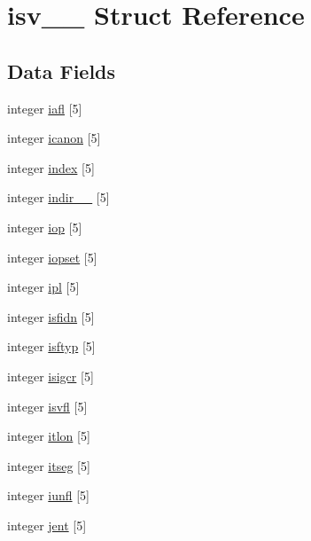 \hypertarget{structisv__1__}{}\section{isv\+\_\+\_\+ Struct Reference}
\label{structisv__1__}
\subsection*{Data Fields}
\begin{DoxyCompactItemize}
\item 
integer \hyperlink{structisv__1___a110053f41da17aeb74e0c20eb537925b}{iafl} \mbox{[}5\mbox{]}
\item 
integer \hyperlink{structisv__1___a60c852ae9ab4f41da8422a78bd2e3ddf}{icanon} \mbox{[}5\mbox{]}
\item 
integer \hyperlink{structisv__1___a204b23597107883203d7e9440f6a2842}{index} \mbox{[}5\mbox{]}
\item 
integer \hyperlink{structisv__1___a94fbd525d54bdfb30be1d9e07ee60ee7}{indir\+\_\+\+\_\+} \mbox{[}5\mbox{]}
\item 
integer \hyperlink{structisv__1___a6f46521e28e3eadcb479e385590fc1a6}{iop} \mbox{[}5\mbox{]}
\item 
integer \hyperlink{structisv__1___a9e20320344cbbf667a8c970a9ba05eab}{iopset} \mbox{[}5\mbox{]}
\item 
integer \hyperlink{structisv__1___a47696a386fd37002d15054e348f709d2}{ipl} \mbox{[}5\mbox{]}
\item 
integer \hyperlink{structisv__1___a20d9b0a1caec9e6e55c4392888cc85b2}{isfidn} \mbox{[}5\mbox{]}
\item 
integer \hyperlink{structisv__1___a95d67e7bab2248a8a3d7efb192a13e45}{isftyp} \mbox{[}5\mbox{]}
\item 
integer \hyperlink{structisv__1___af1060d057ba92173dab9ffa6385a9a4b}{isigcr} \mbox{[}5\mbox{]}
\item 
integer \hyperlink{structisv__1___a68ef3c478c099d73e4744b55c58bb0cc}{isvfl} \mbox{[}5\mbox{]}
\item 
integer \hyperlink{structisv__1___ad62c553111ab8723705b6c605bf0fca8}{itlon} \mbox{[}5\mbox{]}
\item 
integer \hyperlink{structisv__1___a1dd2294ae60dea9bc37e7c6a0f05970a}{itseg} \mbox{[}5\mbox{]}
\item 
integer \hyperlink{structisv__1___a5c11187def0859fb59229fe6f85b5021}{iunfl} \mbox{[}5\mbox{]}
\item 
integer \hyperlink{structisv__1___ab8e7d6b0c01485584b3eaa39df3b5091}{jent} \mbox{[}5\mbox{]}

\end{DoxyCompactItemize}
